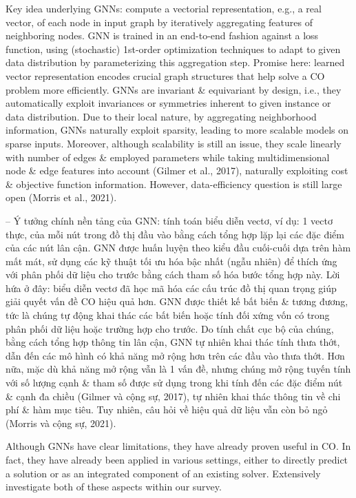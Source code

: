 \documentclass{article}
\begin{document}
\begin{itemize}
\begin{itemize}
        Key idea underlying GNNs: compute a vectorial representation, e.g., a real vector, of each node in input graph by iteratively aggregating features of neighboring nodes. GNN is trained in an end-to-end fashion against a loss function, using (stochastic) 1st-order optimization techniques to adapt to given data distribution by parameterizing this aggregation step. Promise here: learned vector representation encodes crucial graph structures that help solve a CO problem more efficiently. GNNs are invariant \& equivariant by design, i.e., they automatically exploit invariances or symmetries inherent to given instance or data distribution. Due to their local nature, by aggregating neighborhood information, GNNs naturally exploit sparsity, leading to more scalable models on sparse inputs. Moreover, although scalability is still an issue, they scale linearly with number of edges \& employed parameters while taking multidimensional node \& edge features into account (Gilmer et al., 2017), naturally exploiting cost \& objective function information. However, data-efficiency question is still large open (Morris et al., 2021).

        -- Ý tưởng chính nền tảng của GNN: tính toán biểu diễn vectơ, ví dụ: 1 vectơ thực, của mỗi nút trong đồ thị đầu vào bằng cách tổng hợp lặp lại các đặc điểm của các nút lân cận. GNN được huấn luyện theo kiểu đầu cuối-cuối dựa trên hàm mất mát, sử dụng các kỹ thuật tối ưu hóa bậc nhất (ngẫu nhiên) để thích ứng với phân phối dữ liệu cho trước bằng cách tham số hóa bước tổng hợp này. Lời hứa ở đây: biểu diễn vectơ đã học mã hóa các cấu trúc đồ thị quan trọng giúp giải quyết vấn đề CO hiệu quả hơn. GNN được thiết kế bất biến \& tương đương, tức là chúng tự động khai thác các bất biến hoặc tính đối xứng vốn có trong phân phối dữ liệu hoặc trường hợp cho trước. Do tính chất cục bộ của chúng, bằng cách tổng hợp thông tin lân cận, GNN tự nhiên khai thác tính thưa thớt, dẫn đến các mô hình có khả năng mở rộng hơn trên các đầu vào thưa thớt. Hơn nữa, mặc dù khả năng mở rộng vẫn là 1 vấn đề, nhưng chúng mở rộng tuyến tính với số lượng cạnh \& tham số được sử dụng trong khi tính đến các đặc điểm nút \& cạnh đa chiều (Gilmer và cộng sự, 2017), tự nhiên khai thác thông tin về chi phí \& hàm mục tiêu. Tuy nhiên, câu hỏi về hiệu quả dữ liệu vẫn còn bỏ ngỏ (Morris và cộng sự, 2021).

        Although GNNs have clear limitations, they have already proven useful in CO. In fact, they have already been applied in various settings, either to directly predict a solution or as an integrated component of an existing solver. Extensively investigate both of these aspects within our survey.


\end{itemize}
\end{itemize}
\end{document}
